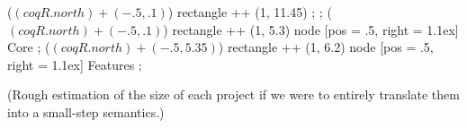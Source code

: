 \documentclass{beamer}
\begin{document}
\begin{frame}
\begin{centertikz}[scale=.5]
         ($(coqR.north) + (-.5, .1)$) rectangle ++ (1, 11.45) ;
         ; %
         ($(coqR.north) + (-.5, .1)$) rectangle ++ (1, 5.3)
          node [pos = .5, right = 1.1ex] {Core} ; %
         ($(coqR.north) + (-.5, 5.35)$) rectangle ++ (1, 6.2)
          node [pos = .5, right = 1.1ex] {Features} ; %

    \end{centertikz}

    \vspace{-3mm}

    \begin{block}{}
      \tiny
    (Rough estimation of the size of each project if we were to entirely translate them into a small-step semantics.)
    \end{block}

    ~\vfill

\end{frame}
\end{document}

